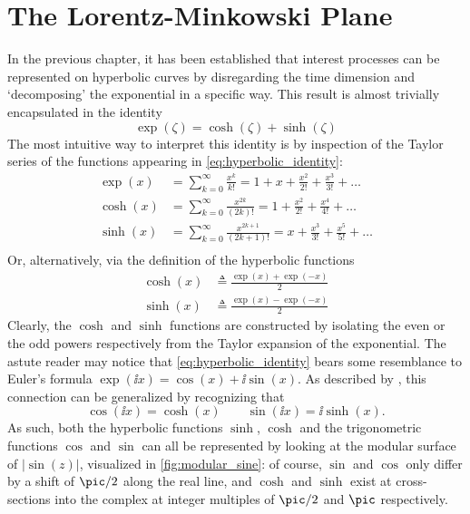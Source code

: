 \chapter{The Lorentz-Minkowski Plane}
\label{chap:lorentz_plane}

In the previous chapter, it has been established that interest processes can be represented on hyperbolic curves by disregarding the time dimension and `decomposing' the exponential in a specific way. This result is almost trivially encapsulated in the identity
\begin{equation}
    \exp(\zeta) = \cosh(\zeta) + \sinh(\zeta)
    \label{eq:hyperbolic_identity}
\end{equation}
The most intuitive way to interpret this identity is by inspection of the Taylor series of the functions appearing in \cref{eq:hyperbolic_identity}:
\begin{equation}
    \begin{split}
        \exp(x) &= \sum_{k = 0}^\infty \frac{x^k}{k!} = 1 + x + \frac{x^2}{2!} + \frac{x^3}{3!} + \ldots\\
        \cosh(x) &= \sum_{k = 0}^\infty \frac{x^{2k}}{(2k)!} = 1 + \frac{x^2}{2!} + \frac{x^4}{4!} + \ldots\\
        \sinh(x) &= \sum_{k = 0}^\infty \frac{x^{2k + 1}}{(2k + 1)!} = x + \frac{x^3}{3!} + \frac{x^5}{5!} + \ldots\\
    \end{split}
\end{equation}
Or, alternatively, via the definition of the hyperbolic functions
\begin{equation}
    \begin{split}
        \cosh(x) &\triangleq \frac{\exp(x) + \exp(-x)}{2}\\
        \sinh(x) &\triangleq \frac{\exp(x) - \exp(-x)}{2}
    \end{split}
\end{equation}
Clearly, the \(\cosh\) and \(\sinh\) functions are constructed by isolating the even or the odd powers respectively from the Taylor expansion of the exponential. The astute reader may notice that \cref{eq:hyperbolic_identity} bears some resemblance to Euler's formula \(\exp(\ii x) = \cos(x) + \ii \sin(x)\). As described by \citet{Needham1997}, this connection can be generalized by recognizing that
\[
     \cos(\ii x) = \cosh(x) \qquad \sin(\ii x) = \ii\sinh(x).
\]
As such, both the hyperbolic functions \(\sinh\), \(\cosh\) and the trigonometric functions \(\cos\) and \(\sin\) can all be represented by looking at the modular surface of \(|\sin(z)|\), visualized in \cref{fig:modular_sine}: of course, \(\sin\) and \(\cos\) only differ by a shift of \(\pic/2\) along the real line, and \(\cosh\) and \(\sinh\) exist at cross-sections into the complex at integer multiples of \(\pic/2\) and \(\pic\) respectively.

